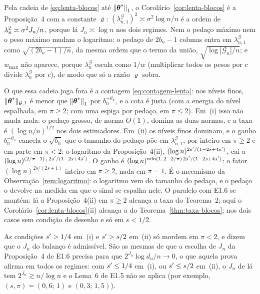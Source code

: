 \documentclass[11pt,a4paper]{article}
\newcommand{\Gcal}{\mathcal{G}}
\newcommand{\bn}{b_{n}}
\newcommand{\nGone}[1]{\lVert #1\rVert_{\mathcal{G},1}}
\newcommand{\lamG}{\lambda^{\mathcal{G}}_{n}}
\newcommand{\lamGone}{\lambda^{\mathcal{G}}_{n,1}}
\begin{document}
\begin{remark}\label{rem:lenta}
Pela cadeia de \eqref{eq:lenta-blocos} até $\left\lVert \boldsymbol{\theta}^{*} \right\rVert_{1}$, o
Corolário~\ref{cor:lenta-blocos} é a Proposição~4 com a constante
$\bar\varrho$: $(\lamGone)^{2} \asymp \sigma^{2}\log n/n$ é a ordem de
$\lambda_{n}^{2} \asymp \sigma^{2}J_{n}/n$, porque lá $J_{n} \asymp \log n$ nos
dois regimes. Nem o pedaço máximo nem o peso máximo mudam o logaritmo: o
pedaço de $2\bn - 1$ colunas entra em $\lamGone$ como $\sqrt{(2\bn-1)/n}$, da
mesma ordem que o termo da união, $\sqrt{\log|\Gcal_{n}|/n}$; e $w_{\max}$ não
aparece, porque $\lamG$ escala como $1/w$ (multiplicar todos os pesos por $c$
divide $\lamG$ por $c$), de modo que só a razão $\varrho$ sobra.

O que essa cadeia joga fora é a contagem \eqref{eq:contagem-lenta}: nos
níveis finos, $\nGone{\thetastar}$ é menor que $\left\lVert \boldsymbol{\theta}^{*} \right\rVert_{1}$ por
$\bn^{-\vartheta_{\pi}}$, e a cota é justa (com a energia do nível espalhada,
em $\pi \ge 2$; com uma espiga por pedaço, em $\pi \le 2$). Em~(i) isso não
muda nada: o pedaço grosso, de norma $O(1)$, domina as duas normas, e a taxa
é $(\log n/n)^{1/2}$ nos dois estimadores. Em~(ii) os níveis finos dominam, e
o ganho $\bn^{-\vartheta_{\pi}}$ cancela o $\sqrt{\bn}$ que o tamanho do pedaço
põe em $\lamGone$, por inteiro em $\pi \ge 2$ e em parte em $\pi < 2$: o
logaritmo da Proposição~4(ii), $(\log n)^{2s'/(1-2s+4s')}$, cai a
$(\log n)^{(2/\pi-1)_{+}2s'/(1-2s+4s')}$. O ganho é
$(\log n)^{\min(1,\,2-2/\pi)\,2s'/(1-2s+4s')}$: o fator
$(\log n)^{2s/(2s+1)}$ inteiro em $\pi \ge 2$, nada em $\pi = 1$. É o mecanismo
da Observação~\ref{rem:logaritmo}: o logaritmo vem do tamanho do pedaço, e o
pedaço o devolve na medida em que o sinal se espalha nele. O paralelo com E1.6
se mantém: lá a Proposição~4(ii) em $\pi \ge 2$ alcança a taxa do Teorema~2;
aqui o Corolário~\ref{cor:lenta-blocos}(ii) alcança a do
Teorema~\ref{thm:taxa-blocos}; nos dois casos sem condição de desenho e só em
$s < 1/2$.

As condições $s' > 1/4$ em~(i) e $s' > s/2$ em~(ii) só mordem em
$\pi < 2$, e dizem que o $J_{n}$ do balanço é admissível. São as mesmas de que
a escolha de $J_{n}$ da Proposição~4 de E1.6 precisa para que
$2^{J_{n}}\log d_{n}/n \to 0$, o que aquela prova afirma em todos os regimes:
com $s' \le 1/4$ em~(i), ou $s' \le s/2$ em~(ii), o $J_{n}$ de lá tem
$2^{J_{n}} \gtrsim n/\log n$ e o Lema~6 de E1.5 não se aplica (por exemplo,
$(s,\pi) = (0{,}6;\,1)$ e $(0{,}3;\,1{,}5)$).


\end{remark}
\end{document}
